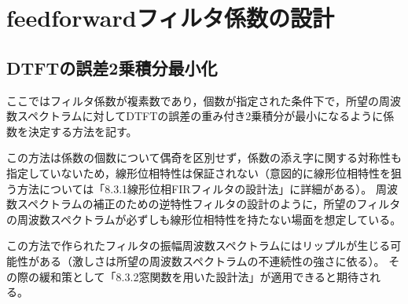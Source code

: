 \section{feedforwardフィルタ係数の設計}
    \subsection{DTFTの誤差2乗積分最小化}
        ここではフィルタ係数が複素数であり，個数が指定された条件下で，所望の周波数スペクトラムに対してDTFTの誤差の重み付き2乗積分が最小になるように係数を決定する方法を記す。
        \par
        この方法は係数の個数について偶奇を区別せず，係数の添え字に関する対称性も指定していないため，線形位相特性は保証されない（意図的に線形位相特性を狙う方法については\cite{learn_sp_from_basic}「8.3.1線形位相FIRフィルタの設計法」に詳細がある）。
        周波数スペクトラムの補正のための逆特性フィルタの設計のように，所望のフィルタの周波数スペクトラムが必ずしも線形位相特性を持たない場面を想定している。
        \par
        この方法で作られたフィルタの振幅周波数スペクトラムにはリップルが生じる可能性がある（激しさは所望の周波数スペクトラムの不連続性の強さに依る）。
        その際の緩和策として\cite{learn_sp_from_basic}「8.3.2窓関数を用いた設計法」が適用できると期待される。
